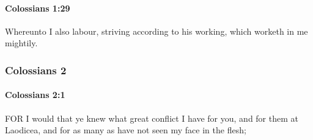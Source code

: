 		\paragraph{Colossians 1:29} %
			\label{COLOSSIANS-1-29}

			Whereunto I also labour, striving according to his working, which worketh in me mightily.

			\begin{framed}
			\scriptsize
				\begin{compactdesc}
					\item[SBLG] 
				\end{compactdesc}
			\end{framed}

	\subsubsection{Colossians 2} %
		\label{COLOSSIANS-2}
		
		\paragraph{Colossians 2:1} %
			\label{COLOSSIANS-2-1}

			FOR I would that ye knew what great conflict I have for you, and for them at Laodicea, and for as many as have not seen my face in the flesh;

